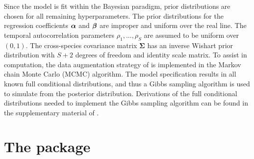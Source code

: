 Since the model is fit within the Bayesian paradigm, prior distributions are chosen for all remaining hyperparameters. The prior distributions for the regression coefficients $\mbox{\boldmath $\alpha$}$ and $\mbox{\boldmath $\beta$}$ are improper and uniform over the real line. The temporal autocorrelation parameters $\rho_1,...,\rho_S$ are assumed to be uniform over $(0, 1).$ The cross-species covariance matrix $\boldsymbol{\Sigma}$ has an inverse Wishart prior distribution with $S+2$ degrees of freedom and identity scale matrix. To assist in computation, the data augmentation strategy of \citet{albertchib1993} is implemented in the Markov chain Monte Carlo (MCMC) algorithm. The model specification results in all known full conditional distributions, and thus a Gibbs sampling algorithm is used to simulate from the posterior distribution. Derivations of the full conditional distributions needed to implement the Gibbs sampling algorithm can be found in the supplementary material of \citet{hepler2021spatiotemporal}.


\section{The  package}

